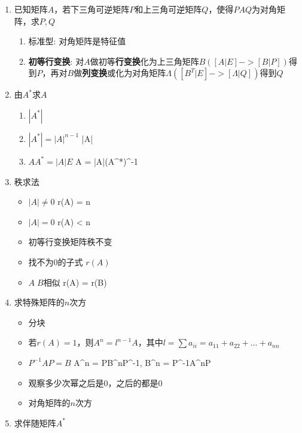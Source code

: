 \documentclass[a4paper,12pt]{article}
\begin{document}
    \begin{enumerate}
        \item 已知矩阵$A$，若下三角可逆矩阵$P$和上三角可逆矩阵$Q$，使得$PAQ$为对角矩阵，求$P, Q$
        \begin{enumerate}
            \item 标准型: 对角矩阵是特征值
            \item \textbf{初等行变换}: 对$A$做初等\textbf{行变换}化为上三角矩阵$B([A | E] -> [B | P])$得到$P$，再对$B$做\textbf{列变换}或{}化为对角矩阵$\Lambda([B^T | E] -> [\Lambda | Q])$得到$Q$
        \end{enumerate}
        \item 由$A^*$求$A$
        \begin{enumerate}
            \item $|A^*|$
            \item $|A^*| = |A|^{n-1}$ \Rightarrow |A|
            \item $AA^* = |A|E$ \Rightarrow A = |A|(A^*)^{-1}
        \end{enumerate}
        \item 秩求法
        \begin{itemize}
            \item $|A| \neq 0$ \Leftrightarrow r(A) = n
            \item $|A| = 0$ \Leftrightarrow r(A) < n
            \item 初等行变换矩阵秩不变
            \item 找不为$0$的子式 \;\le\; $r(A)$
            \item $A\;B$相似 \Rightarrow r(A) = r(B)
        \end{itemize}
        \item 求特殊矩阵的$n$次方
        \begin{itemize}
            \item 分块
            \item 若$r(A) = 1$，则$A^n = l^{n-1}A$，其中$l = \sum {a_{ii}} = a_{11} + a_{22} + \dots + a_{nn}$
            \item $P^{-1}AP = B$ \Rightarrow A^n = PB^{n}P^{-1}, B^n = P^{-1}A^{n}P
            \item 观察多少次幂之后是$0$，之后的都是$0$
            \item 对角矩阵的$n$次方
        \end{itemize}
        \item 求伴随矩阵$A^*$
        \begin{itemize}

\end{itemize}
\end{enumerate}
\end{document}

